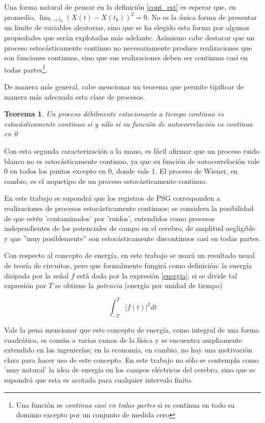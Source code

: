 \documentclass[12pt,a4paper]{mitthesis}
\newtheorem{thrm}{Teorema}
\newcommand{\abso}[1]{\left| #1 \right|}
\begin{document}
Una forma natural de pensar en la definici\'on \ref{cont_est} es esperar que, en promedio,
$\lim_{t \rightarrow t_0} \left( X(t) - X(t_0) \right)^{2} = 0$. 
No es la \'unica forma de presentar un l\'imite de variables aleatorias, sino que se ha elegido esta 
forma por algunas propiedades que ser\'an explotadas m\'as adelante. 
As\'imismo cabe destacar que un proceso estoc\'asticamente continuo no necesariamente produce 
realizaciones que son funciones continuas, sino que sus realizaciones deben ser continuas casi en 
todas partes\footnote{Una funci\'on es \textit{continua casi en todas partes} si es continua en 
todo su dominio excepto por un conjunto de medida cero}.

De manera m\'as general, cabe mencionar un teorema que permite tipificar de manera m\'as
adecuada esta clase de procesos.

\begin{thrm}
Un proceso d\'ebilmente estacionario a tiempo continuo es estoc\'asticamente continuo si y s\'olo 
si su funci\'on de autocorrelaci\'on es continua en 0
\end{thrm}

Con esta segunda caracterizaci\'on a la mano, es f\'acil afirmar que un proceso ruido blanco no es 
estoc\'asticamente continuo, ya que su funci\'on de autocorrelaci\'on vale 0 en todos los puntos
excepto en 0, donde vale 1. 
El proceso de Wiener, en cambio, es el arquetipo de un proceso estoc\'asticamente continuo.

En este trabajo se supondr\'a que los registros de PSG corresponden a realizaciones de procesos 
estoc\'asticamente continuos; se considera la posibilidad de que est\'en 'contaminados' por 
'ruidos', entendidos como procesos independientes de los potenciales de campo en el cerebro, de 
amplitud negligible y que ''muy posiblemente'' son estoc\'asticamente discontinuos casi en todas 
partes.

Con respecto al concepto de energ\'ia, en este trabajo se usar\'a un resultado usual de teor\'ia de 
circuitos, pero que formalmente fungir\'a como definici\'on: la energ\'ia disipada por la se\~nal 
$f$ est\'a dada por la expresi\'on \ref{energia}; si se divide tal expresi\'on por $T$ se obtiene 
la \textit{potencia} (energ\'ia por unidad de tiempo)

\begin{equation}
\int_{-T}^{T} \abso{f\left(t\right)}^{2} dt
\label{energia}
\end{equation}

Vale la pena mencionar que este concepto de energ\'ia, como integral de una forma cuadr\'atica, es 
com\'un a varias ramas de la f\'isica y se encuentra ampliamente extendido en las ingenier\'ias; en 
la econom\'ia, en cambio, no hay una motivaci\'on clara para hacer uso de este concepto. 
En este trabajo no s\'olo se contempla como 'muy natural' la idea de energ\'ia en los campos 
el\'ectricos del cerebro, sino que se supondr\'a que esta es acotada para cualquier intervalo 
finito.
\end{document}
